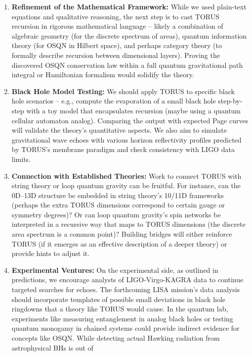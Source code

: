 \documentclass[]{article}
\begin{document}
\begin{enumerate}
\def\labelenumi{\arabic{enumi}.}
\item
  \textbf{Refinement of the Mathematical Framework:} While we used
  plain-text equations and qualitative reasoning, the next step is to
  cast TORUS recursion in rigorous mathematical language -- likely a
  combination of algebraic geometry (for the discrete spectrum of
  areas), quantum information theory (for OSQN in Hilbert space), and
  perhaps category theory (to formally describe recursion between
  dimensional layers). Proving the discovered OSQN conservation law
  within a full quantum gravitational path integral or Hamiltonian
  formalism would solidify the theory.
\item
  \textbf{Black Hole Model Testing:} We should apply TORUS to specific
  black hole scenarios -- e.g., compute the evaporation of a small black
  hole step-by-step with a toy model that encapsulates recursion (maybe
  using a quantum cellular automaton analog). Comparing the output with
  expected Page curves will validate the theory's quantitative aspects.
  We also aim to simulate gravitational wave echoes with various horizon
  reflectivity profiles predicted by TORUS's membrane paradigm and check
  consistency with LIGO data limits.
\item
  \textbf{Connection with Established Theories:} Work to connect TORUS
  with string theory or loop quantum gravity can be fruitful. For
  instance, can the 0D--13D structure be embedded in string theory's
  10/11D frameworks (perhaps the extra TORUS dimensions correspond to
  certain gauge or symmetry degrees)? Or can loop quantum gravity's spin
  networks be interpreted in a recursive way that maps to TORUS
  dimensions (the discrete area spectrum is a common point)? Building
  bridges will either reinforce TORUS (if it emerges as an effective
  description of a deeper theory) or provide hints to adjust it.
\item
  \textbf{Experimental Ventures:} On the experimental side, as outlined
  in predictions, we encourage analysts of LIGO-Virgo-KAGRA data to
  continue targeted searches for echoes. The forthcoming LISA mission's
  data analysis should incorporate templates of possible small
  deviations in black hole ringdowns that a theory like TORUS would
  cause. In the quantum lab, experiments like measuring entanglement in
  analog black holes or testing quantum monogamy in chained systems
  could provide indirect evidence for concepts like OSQN. While
  detecting actual Hawking radiation from astrophysical BHs is out of

\end{enumerate}
\end{document}
